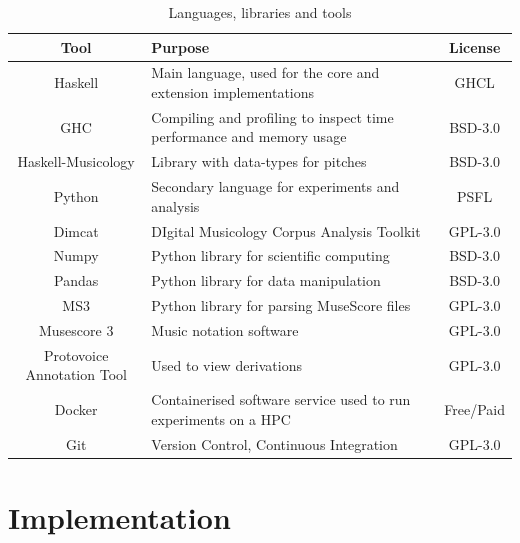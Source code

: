 \documentclass[12pt,a4paper,twoside,openright]{report}
\theoremstyle{definition}
\begin{document}
\begin{table}
  {
  \small
  \caption{Languages, libraries and tools}
  \label{Languages}
  \begin{center}
    \begin{tabularx}{.9\textwidth}{cXc}
      {\large \textbf{Tool}} & {\large \textbf{Purpose}} & {\large \textbf{License}} \\
      \toprule
      Haskell & Main language, used for the core and extension implementations & GHCL \\
      \midrule
      GHC & Compiling and profiling to inspect time performance and memory usage  & BSD-3.0 \\
      \midrule
      Haskell-Musicology & Library with data-types for pitches & BSD-3.0 \\
      \midrule
      Python & Secondary language for experiments and analysis & PSFL \\
      \midrule
      Dimcat & DIgital Musicology Corpus Analysis Toolkit & GPL-3.0 \\
      \midrule
      Numpy & Python library for scientific computing & BSD-3.0 \\
      \midrule
      Pandas & Python library for data manipulation & BSD-3.0 \\
      \midrule
      MS3 & Python library for parsing MuseScore files & GPL-3.0 \\
      \midrule
      Musescore 3 & Music notation software & GPL-3.0 \\
      \midrule
      Protovoice Annotation Tool & Used to view derivations & GPL-3.0 \\
      \midrule
      Docker & Containerised software service used to run experiments on a HPC & Free/Paid \\
      \midrule
      Git & Version Control, Continuous Integration & GPL-3.0 \\
      \bottomrule
    \end{tabularx}
  \end{center}
  }
\end{table}


\chapter{Implementation}
\end{document}
